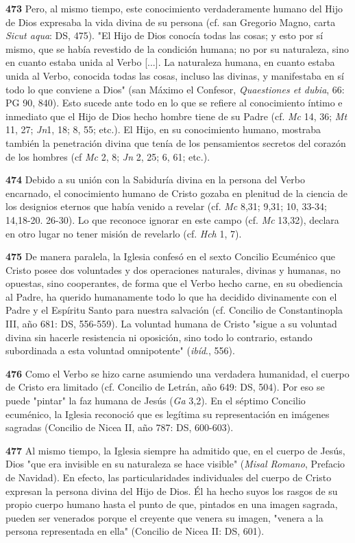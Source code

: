 \documentclass[]{article}
\begin{document}
\textbf{473} Pero, al mismo tiempo, este conocimiento verdaderamente
humano del Hijo de Dios expresaba la vida divina de su persona (cf. san
Gregorio Magno, carta \emph{Sicut aqua}: DS, 475). "El Hijo de Dios
conocía todas las cosas; y esto por sí mismo, que se había revestido de
la condición humana; no por su naturaleza, sino en cuanto estaba unida
al Verbo {[}...{]}. La naturaleza humana, en cuanto estaba unida al
Verbo, conocida todas las cosas, incluso las divinas, y manifestaba en
sí todo lo que conviene a Dios" (san Máximo el Confesor,
\emph{Quaestiones et dubia}, 66: PG 90, 840). Esto sucede ante todo en
lo que se refiere al conocimiento íntimo e inmediato que el Hijo de Dios
hecho hombre tiene de su Padre (cf. \emph{Mc} 14, 36; \emph{Mt} 11, 27;
\emph{Jn}1, 18; 8, 55; etc.). El Hijo, en su conocimiento humano,
mostraba también la penetración divina que tenía de los pensamientos
secretos del corazón de los hombres (cf \emph{Mc} 2, 8; \emph{Jn} 2, 25;
6, 61; etc.).

\textbf{474} Debido a su unión con la Sabiduría divina en la persona del
Verbo encarnado, el conocimiento humano de Cristo gozaba en plenitud de
la ciencia de los designios eternos que había venido a revelar (cf.
\emph{Mc} 8,31; 9,31; 10, 33-34; 14,18-20. 26-30). Lo que reconoce
ignorar en este campo (cf. \emph{Mc} 13,32), declara en otro lugar no
tener misión de revelarlo (cf. \emph{Hch} 1, 7).

\textbf{475} De manera paralela, la Iglesia confesó en el sexto Concilio
Ecuménico que Cristo posee dos voluntades y dos operaciones naturales,
divinas y humanas, no opuestas, sino cooperantes, de forma que el Verbo
hecho carne, en su obediencia al Padre, ha querido humanamente todo lo
que ha decidido divinamente con el Padre y el Espíritu Santo para
nuestra salvación (cf. Concilio de Constantinopla III, año 681: DS,
556-559). La voluntad humana de Cristo "sigue a su voluntad divina sin
hacerle resistencia ni oposición, sino todo lo contrario, estando
subordinada a esta voluntad omnipotente" (\emph{ibíd}., 556).

\textbf{476} Como el Verbo se hizo carne asumiendo una verdadera
humanidad, el cuerpo de Cristo era limitado (cf. Concilio de Letrán, año
649: DS, 504). Por eso se puede "pintar" la faz humana de Jesús
(\emph{Ga} 3,2). En el séptimo Concilio ecuménico, la Iglesia reconoció
que es legítima su representación en imágenes sagradas (Concilio de
Nicea II, año 787: DS, 600-603).

\textbf{477} Al mismo tiempo, la Iglesia siempre ha admitido que, en el
cuerpo de Jesús, Dios "que era invisible en su naturaleza se hace
visible" (\emph{Misal Romano}, Prefacio de Navidad). En efecto, las
particularidades individuales del cuerpo de Cristo expresan la persona
divina del Hijo de Dios. Él ha hecho suyos los rasgos de su propio
cuerpo humano hasta el punto de que, pintados en una imagen sagrada,
pueden ser venerados porque el creyente que venera su imagen, "venera a
la persona representada en ella" (Concilio de Nicea II: DS, 601).
\end{document}
